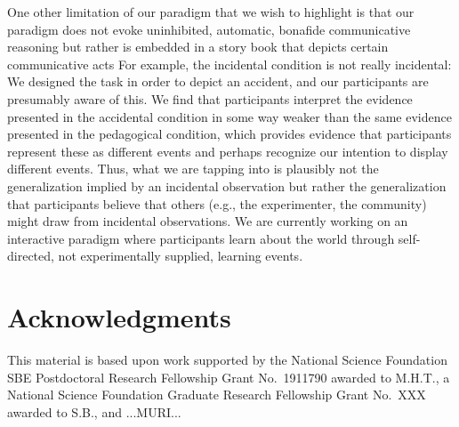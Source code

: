 \documentclass[10pt,letterpaper]{article}
\newcommand{\red}[1]{\textcolor{Red}{#1}}
\begin{document}
One other limitation of our paradigm that we wish to highlight is that our paradigm does not evoke uninhibited, automatic, bonafide communicative reasoning but rather is embedded in a story book that depicts certain communicative acts %
For example, the incidental condition is not really incidental: We designed the task in order to depict an accident, and our participants are presumably aware of this. 
We find that participants interpret the evidence presented in the accidental condition in some way weaker than the same evidence presented in the pedagogical condition, which provides evidence that participants represent these as different events and perhaps recognize our intention to display different events. Thus, what we are tapping into is plausibly not the generalization implied by an incidental observation but rather the generalization that participants believe that others (e.g., the experimenter, the community) might draw from incidental observations. 
We are currently working on an interactive paradigm where participants learn about the world through self-directed, not experimentally supplied, learning events. 


\section{Acknowledgments}

This material is based upon work supported by the National Science Foundation SBE Postdoctoral Research Fellowship Grant No.~1911790 awarded to M.H.T., a National Science Foundation Graduate Research Fellowship Grant No.~XXX awarded to S.B., and ...MURI...



\setlength{\bibleftmargin}{.125in}
\setlength{\bibindent}{-\bibleftmargin}


\end{document}
